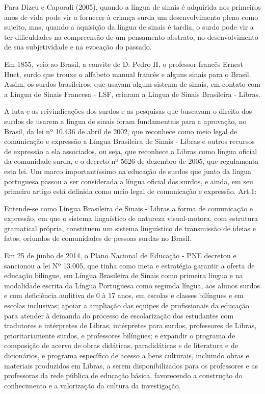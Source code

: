 \documentclass[brasil]{abnt}
\begin{document}
		Para Dizeu e Caporali (2005), quando a língua de sinais é adquirida nos primeiros anos de vida pode vir a fornecer à criança surda um desenvolvimento pleno como sujeito, mas, quando a aquisição da 
		língua de sinais é tardia, o surdo pode vir a ter dificuldades na compreensão de um pensamento abstrato, no desenvolvimento de sua subjetividade e na evocação do passado.
					
		Em 1855, veio ao Brasil, a convite de D. Pedro II, o professor francês Ernest Huet, surdo que trouxe o alfabeto manual francês e alguns sinais para o Brasil. Assim, os surdos brasileiros, que 
		usavam algum sistema de sinais, em contato com a Língua de Sinais Francesa - LSF, criaram a Língua de Sinais Brasileira - Libras. 
		
		A luta e as reivindicações dos surdos e as pesquisas que buscavam o direito dos surdos de usarem a língua de sinais foram fundamentais para a aprovação, no Brasil, da lei nº 10.436 de abril de 2002,
		que reconhece como meio legal de comunicação e expressão a Língua Brasileira de Sinais - Libras e outros recursos de expressão a ela associados, ou seja, que reconhece a Libras como língua oficial 
		da comunidade surda, e o decreto nº 5626 de dezembro de 2005, que regulamenta esta lei. Um marco importantíssimo na educação de surdos que junto da língua portuguesa passou a ser considerada a 
		língua oficial dos surdos, e ainda, em seu primeiro artigo está definida como meio legal de comunicação e expressão. Art.1:
			
				\begin{citacao} Entende-se como Língua Brasileira de Sinais - Libras a forma de comunicação e expressão, em que o sistema linguístico de natureza visual-motora, com estrutura gramatical própria, constituem
								um sistema linguístico de transmissão de ideias e fatos, oriundos de comunidades de pessoas surdas no Brasil.
				\end{citacao}
				
		Em 25 de junho de 2014, o Plano Nacional de Educação - PNE decretou e sancionou a lei Nº 13.005, que tinha como meta e estratégia garantir a oferta de educação bilíngue, em Língua Brasileira de Sinais 
		como primeira língua e na modalidade escrita da Língua Portuguesa como segunda língua, aos alunos surdos e com deficiência auditiva de 0 à 17 anos, em escolas e classes bilíngues e em escolas 
		inclusivas; apoiar a ampliação das equipes de profissionais da educação para atender à demanda do processo de escolarização dos estudantes com tradutores e intérpretes de Libras, intérpretes para surdos, 
		professores de Libras, prioritariamente surdos, e professores bilíngues; e expandir o programa de composição de acervo de obras didáticas, paradidáticas e de literatura e de dicionários, e programa 
		específico de acesso a bens culturais, incluindo obras e materiais produzidos em Libras, a serem disponibilizados para os professores e as professoras da rede pública de educação básica, favorecendo a 
		construção do conhecimento e a valorização da cultura da investigação.
				
\end{document}
